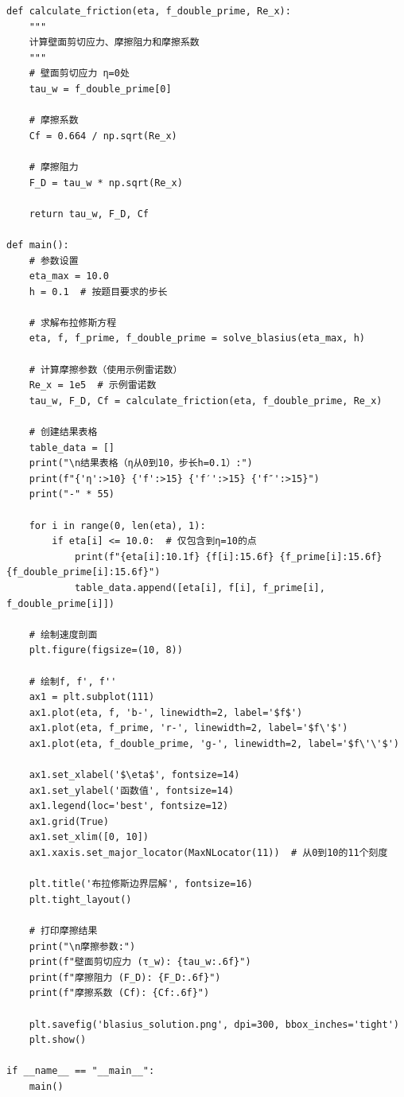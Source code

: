 \documentclass[12pt,a4paper]{article}
\begin{document}
\begin{lstlisting}[caption=布拉修斯方程求解的完整Python代码]
def calculate_friction(eta, f_double_prime, Re_x):
    """
    计算壁面剪切应力、摩擦阻力和摩擦系数
    """
    # 壁面剪切应力 η=0处
    tau_w = f_double_prime[0]
    
    # 摩擦系数
    Cf = 0.664 / np.sqrt(Re_x)
    
    # 摩擦阻力
    F_D = tau_w * np.sqrt(Re_x)
    
    return tau_w, F_D, Cf

def main():
    # 参数设置
    eta_max = 10.0
    h = 0.1  # 按题目要求的步长
    
    # 求解布拉修斯方程
    eta, f, f_prime, f_double_prime = solve_blasius(eta_max, h)
    
    # 计算摩擦参数（使用示例雷诺数）
    Re_x = 1e5  # 示例雷诺数
    tau_w, F_D, Cf = calculate_friction(eta, f_double_prime, Re_x)
    
    # 创建结果表格
    table_data = []
    print("\n结果表格（η从0到10，步长h=0.1）:")
    print(f"{'η':>10} {'f':>15} {'f′':>15} {'f″':>15}")
    print("-" * 55)
    
    for i in range(0, len(eta), 1):
        if eta[i] <= 10.0:  # 仅包含到η=10的点
            print(f"{eta[i]:10.1f} {f[i]:15.6f} {f_prime[i]:15.6f} {f_double_prime[i]:15.6f}")
            table_data.append([eta[i], f[i], f_prime[i], f_double_prime[i]])
    
    # 绘制速度剖面
    plt.figure(figsize=(10, 8))
    
    # 绘制f, f', f''
    ax1 = plt.subplot(111)
    ax1.plot(eta, f, 'b-', linewidth=2, label='$f$')
    ax1.plot(eta, f_prime, 'r-', linewidth=2, label='$f\'$')
    ax1.plot(eta, f_double_prime, 'g-', linewidth=2, label='$f\'\'$')
    
    ax1.set_xlabel('$\eta$', fontsize=14)
    ax1.set_ylabel('函数值', fontsize=14)
    ax1.legend(loc='best', fontsize=12)
    ax1.grid(True)
    ax1.set_xlim([0, 10])
    ax1.xaxis.set_major_locator(MaxNLocator(11))  # 从0到10的11个刻度
    
    plt.title('布拉修斯边界层解', fontsize=16)
    plt.tight_layout()
    
    # 打印摩擦结果
    print("\n摩擦参数:")
    print(f"壁面剪切应力 (τ_w): {tau_w:.6f}")
    print(f"摩擦阻力 (F_D): {F_D:.6f}")
    print(f"摩擦系数 (Cf): {Cf:.6f}")
    
    plt.savefig('blasius_solution.png', dpi=300, bbox_inches='tight')
    plt.show()

if __name__ == "__main__":
    main()
\end{lstlisting}
\end{document}
